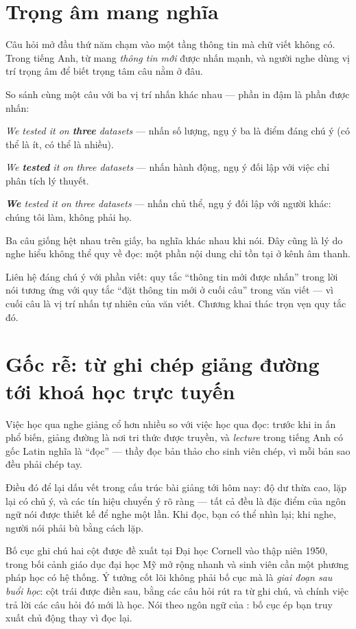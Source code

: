 \documentclass[../../english.tex]{subfiles}
\begin{document}
\section{Trọng âm mang nghĩa}

Câu hỏi mở đầu thứ năm chạm vào một tầng thông tin mà chữ viết không có. Trong tiếng Anh, từ mang \emph{thông tin mới} được nhấn mạnh, và người nghe dùng vị trí trọng âm để biết trọng tâm câu nằm ở đâu.

So sánh cùng một câu với ba vị trí nhấn khác nhau --- phần in đậm là phần được nhấn:

\emph{We tested it on \textbf{three} datasets} --- nhấn số lượng, ngụ ý ba là điểm đáng chú ý (có thể là ít, có thể là nhiều).

\emph{We \textbf{tested} it on three datasets} --- nhấn hành động, ngụ ý đối lập với việc chỉ phân tích lý thuyết.

\emph{\textbf{We} tested it on three datasets} --- nhấn chủ thể, ngụ ý đối lập với người khác: chúng tôi làm, không phải họ.

Ba câu giống hệt nhau trên giấy, ba nghĩa khác nhau khi nói. Đây cũng là lý do nghe hiểu không thể quy về đọc: một phần nội dung chỉ tồn tại ở kênh âm thanh.

Liên hệ đáng chú ý với phần viết: quy tắc ``thông tin mới được nhấn'' trong lời nói tương ứng với quy tắc ``đặt thông tin mới ở cuối câu'' trong văn viết --- vì cuối câu là vị trí nhấn tự nhiên của văn viết. Chương  khai thác trọn vẹn quy tắc đó.

\section{Gốc rễ: từ ghi chép giảng đường tới khoá học trực tuyến}

Việc học qua nghe giảng cổ hơn nhiều so với việc học qua đọc: trước khi in ấn phổ biến, giảng đường là nơi tri thức được truyền, và \emph{lecture} trong tiếng Anh có gốc Latin nghĩa là ``đọc'' --- thầy đọc bản thảo cho sinh viên chép, vì mỗi bản sao đều phải chép tay.

Điều đó để lại dấu vết trong cấu trúc bài giảng tới hôm nay: độ dư thừa cao, lặp lại có chủ ý, và các tín hiệu chuyển ý rõ ràng --- tất cả đều là đặc điểm của ngôn ngữ nói được thiết kế để nghe một lần. Khi đọc, bạn có thể nhìn lại; khi nghe, người nói phải bù bằng cách lặp.

Bố cục ghi chú hai cột được đề xuất tại Đại học Cornell vào thập niên 1950, trong bối cảnh giáo dục đại học Mỹ mở rộng nhanh và sinh viên cần một phương pháp học có hệ thống. Ý tưởng cốt lõi không phải bố cục mà là \emph{giai đoạn sau buổi học}: cột trái được điền sau, bằng các câu hỏi rút ra từ ghi chú, và chính việc trả lời các câu hỏi đó mới là học. Nói theo ngôn ngữ của : bố cục ép bạn truy xuất chủ động thay vì đọc lại.
\end{document}
